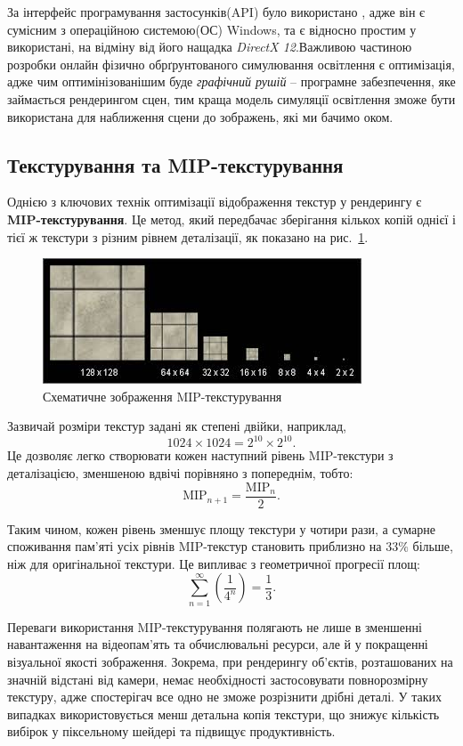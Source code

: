 За інтерфейс програмування застосунків(API) було використано
, адже він є сумісним з операційною системою(ОС) Windows, та є відносно простим у використані, на відміну від його нащадка \textit{DirectX 12}.Важливою частиною розробки онлайн фізично обрґрунтованого симулювання освітлення є оптимізація, адже чим оптимінізованішим буде \textit{графічний рушій} -- програмне забезпечення, яке займається рендерингом сцен, тим краща модель симуляції освітлення зможе бути використана для наближення сцени до зображень, які ми бачимо оком.

\subsection{Текстурування та MIP-текстурування}

Однією з ключових тех\-нік оптимізації відображення текстур у рендерингу є \textbf{MIP-текстурування}. Це метод, який передбачає зберігання кількох копій однієї і тієї ж текстури з різним рівнем деталізації, як показано на рис.~\ref{fig:Mip}.

\begin{figure}[h]
  \centering
  \includegraphics[scale=0.75]{Pictures/images.jpeg}
  \caption{Схематичне зображення MIP-текстурування}
  \label{fig:Mip}
\end{figure}

Зазвичай розміри текстур задані як степені двійки, наприклад, $$1024 \times 1024 = 2^{10} \times 2^{10}.$$ Це дозволяє легко створювати кожен наступний рівень MIP-текстури з деталізацією, зменшеною вдвічі порівняно з попереднім, тобто:
\[
\text{MIP}_{n+1} = \frac{\text{MIP}_n}{2}.
\]

Таким чином, кожен рівень зменшує площу текстури у чотири рази, а сумарне споживання пам’яті усіх рівнів MIP-текстур становить приблизно на $33\%$ більше, ніж для оригінальної текстури. Це випливає з геометричної прогресії площ:
\[
\sum_{n=1}^{\infty} \left(\frac{1}{4^n}\right) = \frac{1}{3}.
\]

Переваги використання MIP-текстурування полягають не лише в зменшенні навантаження на відеопам’ять та обчислювальні ресурси, але й у покращенні візуальної якості зображення. Зокрема, при рендерингу об’єктів, розташованих на значній відстані від камери, немає необхідності застосовувати пов\-но\-роз\-мір\-ну текстуру, адже спостерігач все одно не зможе розрізнити дрібні деталі. У таких випадках використовується менш детальна копія текстури, що знижує кількість вибірок у піксельному шейдері та підвищує продуктивність.

